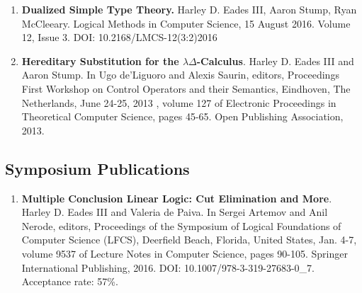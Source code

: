 \documentclass{article}
\begin{document}
  \begin{enumerate}
  \item \textbf{Dualized Simple Type Theory.} Harley D. Eades III, Aaron
    Stump, Ryan McCleeary. Logical Methods in Computer Science, 15
    August 2016. Volume 12, Issue 3. DOI: 10.2168/LMCS-12(3:2)2016

  \item \textbf{Hereditary Substitution for the
    $\lambda\Delta$-Calculus}.  Harley D. Eades III and Aaron Stump.
    In Ugo de'Liguoro and Alexis Saurin, editors, Proceedings First
    Workshop on Control Operators and their Semantics, Eindhoven, The
    Netherlands, June 24-25, 2013 , volume 127 of Electronic
    Proceedings in Theoretical Computer Science, pages 45-65. Open
    Publishing Association, 2013.

  \end{enumerate}

  \subsection{Symposium Publications}
  \label{subsec:symposium_publications}
  \begin{enumerate}
  \item \textbf{Multiple Conclusion Linear Logic: Cut Elimination and
    More}.  Harley D. Eades III and Valeria de Paiva. In Sergei Artemov
    and Anil Nerode, editors, Proceedings of the Symposium of Logical
    Foundations of Computer Science (LFCS), Deerfield Beach, Florida,
    United States, Jan. 4-7, volume 9537 of Lecture Notes in Computer
    Science, pages 90-105. Springer International Publishing,
    2016. DOI: 10.1007/978-3-319-27683-0\_7.  Acceptance rate: 57\%.
  \end{enumerate}
  
\end{document}
